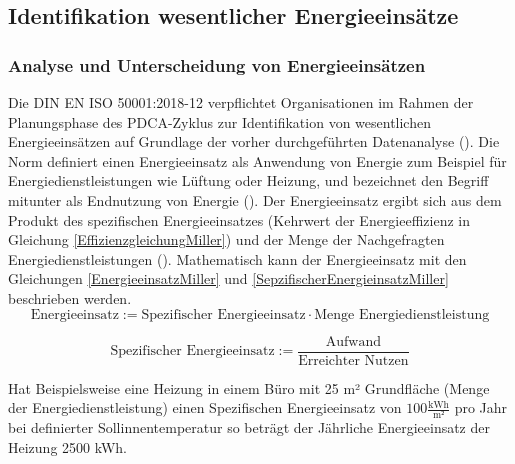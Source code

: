 \subsection{Identifikation wesentlicher Energieeinsätze}

\subsubsection{Analyse und Unterscheidung von Energieeinsätzen}

Die DIN EN ISO 50001:2018-12 verpflichtet Organisationen im Rahmen der Planungsphase des PDCA-Zyklus zur Identifikation von wesentlichen Energieeinsätzen auf Grundlage 
der vorher durchgeführten Datenanalyse (\cite[S. 25]{DIN50001.2018}).
Die Norm definiert einen Energieeinsatz als Anwendung von Energie zum Beispiel für Energiedienstleistungen wie Lüftung oder Heizung, und bezeichnet den Begriff mitunter als 
Endnutzung von Energie (\cite[Kapitel 3.5.4]{DIN50001.2018}). 
Der Energieeinsatz ergibt sich aus dem Produkt des spezifischen Energieeinsatzes (Kehrwert der Energieeffizienz in Gleichung \eqref{EffizienzgleichungMiller}) 
und der Menge der Nachgefragten Energiedienstleistungen (\cite[S. 120]{Miller.2016}).
Mathematisch kann der Energieeinsatz mit den Gleichungen \eqref{EnergieeinsatzMiller} und \eqref{SepzifischerEnergieinsatzMiller} beschrieben werden.
\begin{equation}
    \text{Energieeinsatz} := \text{Spezifischer Energieeinsatz} \cdot \text{Menge Energiedienstleistung}
    \label{EnergieeinsatzMiller}
\end{equation}

\begin{equation}
    \text{Spezifischer Energieeinsatz} :=\frac{\text{Aufwand}}{\text{Erreichter Nutzen}}
    \label{SepzifischerEnergieinsatzMiller}
\end{equation}

Hat Beispielsweise eine Heizung in einem Büro mit 25 m² Grundfläche (Menge der Energiedienstleistung) einen Spezifischen Energieeinsatz von $100 \frac{\text{kWh}}{\text{m²}}$ pro Jahr 
bei definierter Sollinnentemperatur so beträgt der Jährliche Energieeinsatz der Heizung 2500 kWh.

